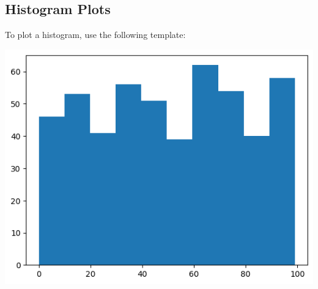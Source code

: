 \subsection{Histogram Plots}
To plot a histogram, use the following template:
\begin{minipage}{0.49\linewidth}
    
\end{minipage}
\begin{minipage}{0.49\linewidth}
    \includegraphics[width = \linewidth]{src/5_matplotlib/images/histogram_plot.png}
\end{minipage}

